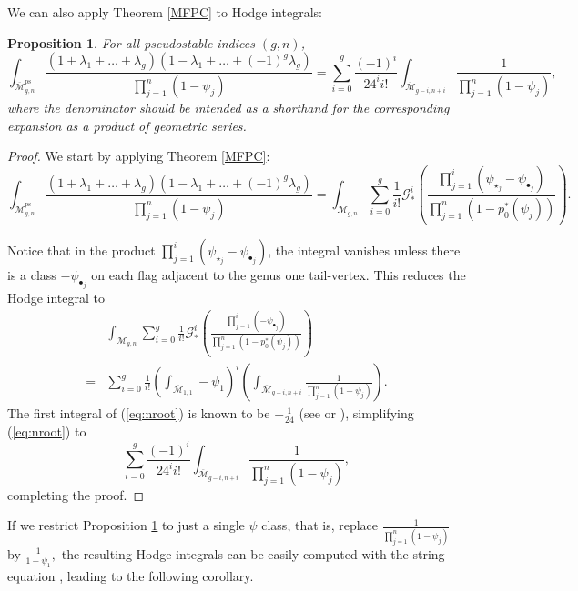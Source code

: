 \documentclass[leqno,12pt]{amsart}
\newtheorem{proposition}[theorem]{Proposition}
\theoremstyle{remark}
\numberwithin{equation}{section}
\DeclareMathOperator{\ps}{ps}
\begin{document}
We can also apply Theorem \ref{MFPC} to Hodge integrals:

\begin{proposition} \label{MFint}
    For all pseudostable indices $(g, n)$,
    $$
    \int_{\overline{\mathcal{M}}^{\ps}_{g, n}}\frac{(1 + \lambda_1 + \dots + \lambda_g)(1 - \lambda_1 + \dots + (-1)^g\lambda_g)}{\prod_{j = 1}^n(1-\psi_j)} =  \sum_{i=0}^g\frac{(-1)^i}{24^ii!}\int_{\overline{\mathcal{M}}_{g-i, n+i}}\frac{1}{\prod_{j=1}^n(1-\psi_j)},
    $$ 
    where the denominator should be intended as a shorthand for the corresponding expansion as a product of geometric series.
\end{proposition}
\begin{proof} We start by applying Theorem \ref{MFPC}:
\begin{equation*}
   \int_{\overline{\mathcal{M}}^{\ps}_{g, n}}\frac{(1 + \lambda_1 + \dots + \lambda_g)(1 - \lambda_1 + \dots + (-1)^g\lambda_g)}{\prod_{j = 1}^n(1-\psi_j)} = \int_{\overline{\mathcal{M}}_{g, n}}\sum_{i=0}^g\frac{1}{i!}\mathcal{G}_*^i\left(\frac{\prod_{j=1}^i(\psi_{\star_j}-\psi_{\bullet_j})}{\prod_{j = 1}^n(1-p_0^\ast(\psi_j))}\right). 
\end{equation*}
    
Notice that in the product $\prod_{j=1}^i(\psi_{\star_j}-\psi_{\bullet_j})$, the integral vanishes unless there is a class $-\psi_{\bullet_j}$ on each flag adjacent to the genus one tail-vertex. This reduces the Hodge integral to 
\begin{align}\label{eq:nroot}
    &\int_{\overline{\mathcal{M}}_{g, n}}\sum_{i=0}^g\frac{1}{i!}\mathcal{G}_*^i\left(\frac{\prod_{j=1}^i(-\psi_{\bullet_j})}{\prod_{j = 1}^n(1-p_0^\ast(\psi_j))}\right) \nonumber\\ 
    = &\sum_{i=0}^g\frac{1}{i!}\left(\int_{\overline{\mathcal{M}}_{1, 1}}-\psi_{1}\right)^i\left(\int_{\overline{\mathcal{M}}_{g-i, n+i}}\frac{1}{\prod_{j=1}^n(1-\psi_j)}\right).
\end{align}
The first integral of (\ref{eq:nroot}) is known to be $-\frac{1}{24}$ (see \cite{vakil2006moduli} or \cite{zvonkine2014introduction}), simplifying (\ref{eq:nroot}) to 
$$
\sum_{i=0}^g\frac{(-1)^i}{24^ii!}\int_{\overline{\mathcal{M}}_{g-i, n+i}}\frac{1}{\prod_{j=1}^n(1-\psi_j)},
$$
completing the proof.
\end{proof}

If we restrict Proposition \ref{MFint} to just a single $\psi$ class, that is, replace 
$
\frac{1}{\prod_{j = 1}^n(1-\psi_j)}$ by $ \frac{1}{1-\psi_1},
$
the resulting Hodge integrals can be easily computed with the string equation \cite{witten1990two}, leading to the following corollary.
\end{document}
